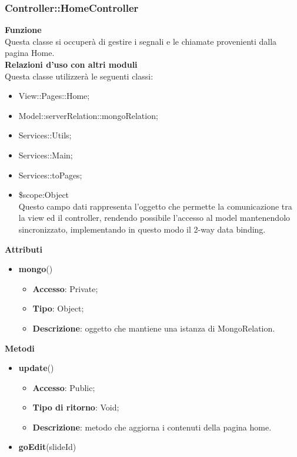 {	\subsubsection{Controller::\-HomeController}{
		\label{sub:homecontroller}
		\textbf{Funzione}\\
		\indent Questa classe si occuperà di gestire i segnali e le chiamate provenienti dalla pagina Home.\\
		\textbf{Relazioni d'uso con altri moduli}\\
		\indent Questa classe utilizzerà le seguenti classi:
		\begin{itemize}
			\item View::\-Pages::\-Home;
			\item Model::\-serverRelation::\-mongoRelation;
			\item Services::\-Utils;
			\item Services::\-Main;
			\item Services::\-toPages;
			\item \$scope:Object\\
				\indent Questo campo dati rappresenta l’oggetto che permette la comunicazione tra la view ed il controller, rendendo possibile l’accesso al model mantenendolo sincronizzato, implementando in questo modo il 2-way data binding.
		\end{itemize}
		\textbf{Attributi}\\
		\begin{itemize}
			\item \textbf{mongo}()
			\begin{itemize}
				\item \textbf{Accesso}: Private;
				\item \textbf{Tipo}: Object;
				\item \textbf{Descrizione}: oggetto che mantiene una istanza di MongoRelation.
			\end{itemize}
	    \end{itemize}
		\textbf{Metodi}
		\begin{itemize}
			\item \textbf{update}()
			\begin{itemize}
				\item \textbf{Accesso}: Public;
				\item \textbf{Tipo di ritorno}: Void;
				\item \textbf{Descrizione}: metodo che aggiorna i contenuti della pagina home.
			\end{itemize}
			\item \textbf{goEdit}(slideId)

\end{itemize}}}
